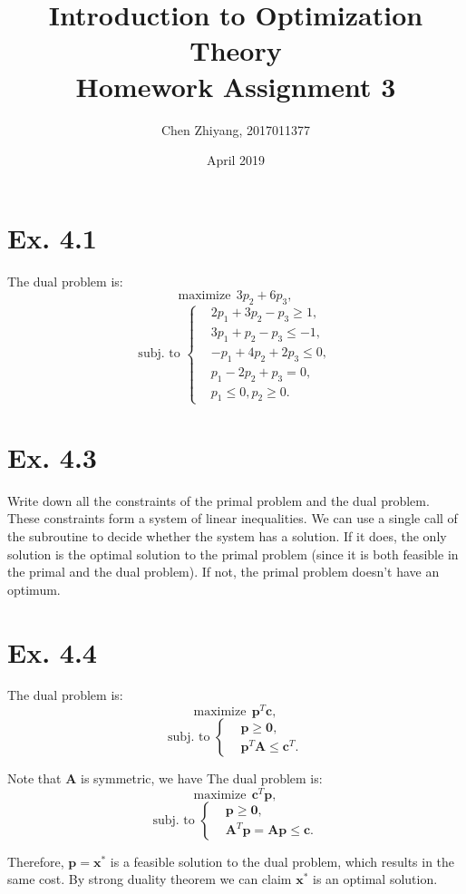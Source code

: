 \documentclass[12pt]{article}
\title{Introduction to Optimization Theory\\Homework Assignment 3}
\author{Chen Zhiyang, 2017011377}
\date{April 2019}
\begin{document}
\maketitle

\section*{Ex. 4.1}
The dual problem is:
$$\text{maximize}\ \ 3p_2+6p_3,$$
$$\text{subj.\ to\ }\left\{\begin{aligned}
    &2p_1+3p_2-p_3\ge 1,\\
    &3p_1+p_2-p_3\le -1,\\
    &-p_1+4p_2+2p_3\le 0,\\
    &p_1-2p_2+p_3=0,\\
    &p_1\le 0,p_2\ge 0.
\end{aligned}\right.$$

\section*{Ex. 4.3}
Write down all the constraints of the primal problem and the dual problem. These constraints form a system of linear inequalities. We can use a single call of the subroutine to decide whether the system has a solution. If it does, the only solution is the optimal solution to the primal problem (since it is both feasible in the primal and the dual problem). If not, the primal problem doesn't have an optimum.

\section*{Ex. 4.4}
The dual problem is:
$$\text{maximize}\ \ \bm{p}^T\bm{c},$$
$$\text{subj.\ to\ }\left\{\begin{aligned}
    &\bm{p}\ge\bm{0},\\
    &\bm{p}^T\bm{A}\le\bm{c}^T.
\end{aligned}\right.$$

Note that $\bm{A}$ is symmetric, we have
The dual problem is:
$$\text{maximize}\ \ \bm{c}^T\bm{p},$$
$$\text{subj.\ to\ }\left\{\begin{aligned}
    &\bm{p}\ge\bm{0},\\
    &\bm{A}^T\bm{p}=\bm{A}\bm{p}\le\bm{c}.
\end{aligned}\right.$$

Therefore, $\bm{p}=\bm{x}^*$ is a feasible solution to the dual problem, which results in the same cost. By strong duality theorem we can claim $\bm{x}^*$ is an optimal solution.
\end{document}
